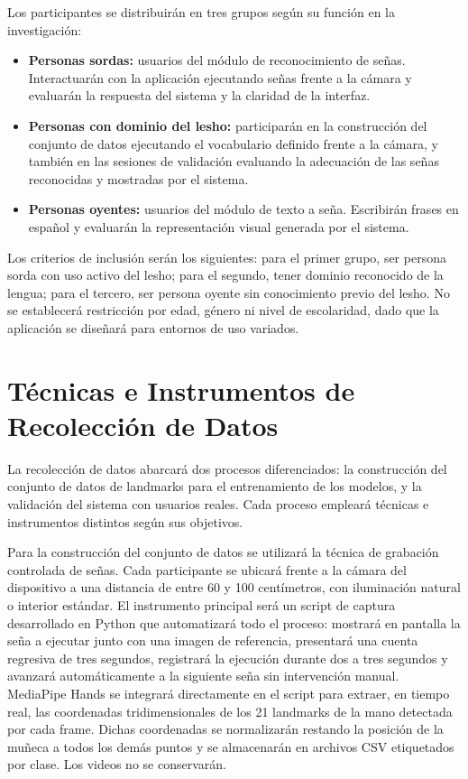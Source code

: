 Los participantes se distribuirán en tres grupos según su función en la investigación:

\begin{itemize}
    \item \textbf{Personas sordas:} usuarios del módulo de reconocimiento de señas.
    Interactuarán con la aplicación ejecutando señas frente a la cámara y evaluarán la
    respuesta del sistema y la claridad de la interfaz.
    \item \textbf{Personas con dominio del \acrshort{lesho}:} participarán en la construcción del
    conjunto de datos ejecutando el vocabulario definido frente a la cámara, y también en
    las sesiones de validación evaluando la adecuación de las señas reconocidas y mostradas
    por el sistema.
    \item \textbf{Personas oyentes:} usuarios del módulo de texto a seña. Escribirán frases
    en español y evaluarán la representación visual generada por el sistema.
\end{itemize}

Los criterios de inclusión serán los siguientes: para el primer grupo, ser persona
sorda con uso activo del \acrshort{lesho}; para el segundo, tener dominio reconocido de la
lengua; para el tercero, ser persona oyente sin conocimiento previo del \acrshort{lesho}. No se
establecerá restricción por edad, género ni nivel de escolaridad, dado que la aplicación
se diseñará para entornos de uso variados.

\section{Técnicas e Instrumentos de Recolección de Datos}

La recolección de datos abarcará dos procesos diferenciados: la construcción del conjunto
de datos de landmarks para el entrenamiento de los modelos, y la validación del sistema
con usuarios reales. Cada proceso empleará técnicas e instrumentos distintos según sus
objetivos.

Para la construcción del conjunto de datos se utilizará la técnica de grabación controlada
de señas. Cada participante se ubicará frente a la cámara del dispositivo a una distancia
de entre 60 y 100 centímetros, con iluminación natural o interior estándar. El
instrumento principal será un script de captura desarrollado en Python que automatizará
todo el proceso: mostrará en pantalla la seña a ejecutar junto con una imagen de
referencia, presentará una cuenta regresiva de tres segundos, registrará la ejecución
durante dos a tres segundos y avanzará automáticamente a la siguiente seña sin
intervención manual. MediaPipe Hands se integrará directamente en
el script para extraer, en tiempo real, las coordenadas tridimensionales de los 21
landmarks de la mano detectada por cada frame. Dichas coordenadas se normalizarán
restando la posición de la muñeca a todos los demás puntos y se almacenarán en archivos
CSV etiquetados por clase. Los videos no se conservarán.

